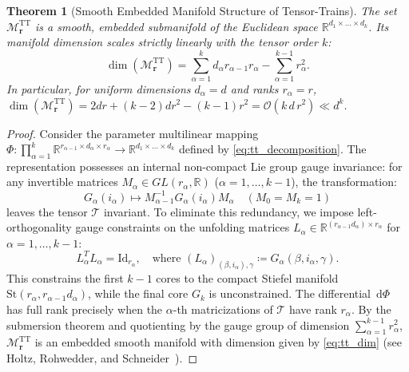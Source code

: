 \documentclass[11pt,a4paper,reqno]{amsart}
\newtheorem{theorem}{Theorem}[section]
\theoremstyle{definition}
\numberwithin{equation}{section}
\providecommand{\R}{\mathbb{R}}
\newcommand{\Id}{\mathrm{Id}}
\newcommand{\dif}{\,\mathrm{d}}
\providecommand{\R}{\mathbb{R}}
\begin{document}
\begin{theorem}[Smooth Embedded Manifold Structure of Tensor-Trains]
\label{thm:tt_manifold}
The set $\mathcal{M}_{\mathbf{r}}^{\mathrm{TT}}$ is a smooth, embedded submanifold of the Euclidean space $\R^{d_1 \times \dots \times d_k}$. Its manifold dimension scales strictly linearly with the tensor order $k$:
\begin{equation}
    \label{eq:tt_dim}
    \dim(\mathcal{M}_{\mathbf{r}}^{\mathrm{TT}}) = \sum_{\alpha=1}^k d_\alpha r_{\alpha-1} r_\alpha - \sum_{\alpha=1}^{k-1} r_\alpha^2.
\end{equation}
In particular, for uniform dimensions $d_\alpha = d$ and ranks $r_\alpha = r$, $\dim(\mathcal{M}_{\mathbf{r}}^{\mathrm{TT}}) = 2 d r + (k-2) d r^2 - (k-1) r^2 = \mathcal{O}(k \, d \, r^2) \ll d^k$.
\end{theorem}
\begin{proof}
Consider the parameter multilinear mapping $\Phi \colon \prod_{\alpha=1}^k \R^{r_{\alpha-1} \times d_\alpha \times r_\alpha} \to \R^{d_1 \times \dots \times d_k}$ defined by \eqref{eq:tt_decomposition}. The representation possesses an internal non-compact Lie group gauge invariance: for any invertible matrices $M_\alpha \in GL(r_\alpha, \R)$ ($\alpha = 1, \dots, k-1$), the transformation:
\begin{equation}
    \label{eq:tt_gauge_transformation}
    G_\alpha(i_\alpha) \mapsto M_{\alpha-1}^{-1} G_\alpha(i_\alpha) M_\alpha \quad (M_0 = M_k = 1)
\end{equation}
leaves the tensor $\mathcal{T}$ invariant. To eliminate this redundancy, we impose left-orthogonality gauge constraints on the unfolding matrices $L_\alpha \in \R^{(r_{\alpha-1} d_\alpha) \times r_\alpha}$ for $\alpha = 1, \dots, k-1$:
\begin{equation}
    L_\alpha^T L_\alpha = \Id_{r_\alpha}, \quad \text{where } (L_\alpha)_{(\beta, i_\alpha), \gamma} \coloneqq G_\alpha(\beta, i_\alpha, \gamma).
\end{equation}
This constrains the first $k-1$ cores to the compact Stiefel manifold $\mathrm{St}(r_\alpha, r_{\alpha-1} d_\alpha)$, while the final core $G_k$ is unconstrained. The differential $\dif \Phi$ has full rank precisely when the $\alpha$-th matricizations of $\mathcal{T}$ have rank $r_\alpha$. By the submersion theorem and quotienting by the gauge group of dimension $\sum_{\alpha=1}^{k-1} r_\alpha^2$, $\mathcal{M}_{\mathbf{r}}^{\mathrm{TT}}$ is an embedded smooth manifold with dimension given by \eqref{eq:tt_dim} (see Holtz, Rohwedder, and Schneider~\cite{holtz2012tensor}).
\end{proof}
\end{document}
